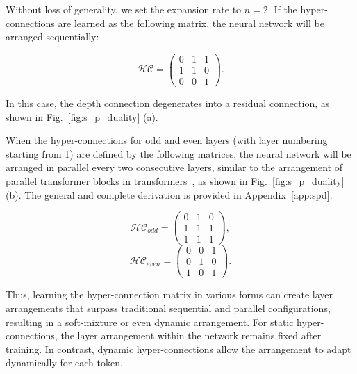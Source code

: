 \documentclass{article} %
\begin{document}
Without loss of generality, we set the expansion rate to $n=2$. 
If the hyper-connections are learned as the following matrix, the neural network will be arranged sequentially:



\begin{equation}
\mathcal{HC}=\begin{pmatrix}
0 & 1 & 1\\
1 & 1 & 0\\
0 & 0 & 1
\end{pmatrix}.
\end{equation}

In this case, the depth connection degenerates into a residual connection, as shown in Fig.~\ref{fig:s_p_duality} (a).

When the hyper-connections for odd and even layers (with layer numbering starting from 1) are defined by the following matrices, the neural network will be arranged in parallel every two consecutive layers, similar to the arrangement of parallel transformer blocks in transformers~\citep{mesh-transformer-jax}, as shown in Fig.~\ref{fig:s_p_duality} (b). The general and complete derivation is provided in Appendix~\ref{app:spd}.

\begin{multicols}{2}
  \begin{equation}
  \mathcal{HC}_{odd}=
    \begin{pmatrix}
    0 & 1 & 0\\
    1 & 1 & 1\\
    1 & 1 & 1
    \end{pmatrix},
  \end{equation}
  \break
  \begin{equation}
  \mathcal{HC}_{even}=
    \begin{pmatrix}
    0 & 0 & 1\\
    0 & 1 & 0\\
    1 & 0 & 1
    \end{pmatrix}.
  \end{equation}
\end{multicols}

Thus, learning the hyper-connection matrix in various forms can create layer arrangements that surpass traditional sequential and parallel configurations, resulting in a soft-mixture or even dynamic arrangement. For static hyper-connections, the layer arrangement within the network remains fixed after training. In contrast, dynamic hyper-connections allow the arrangement to adapt dynamically for each token.
\end{document}
